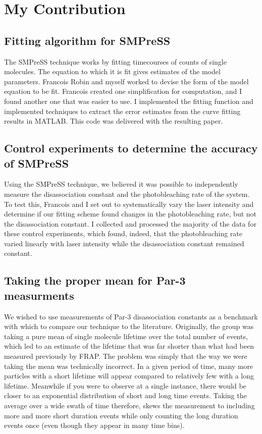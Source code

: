 \section{My Contribution}

\subsection{Fitting algorithm for SMPreSS}

The SMPreSS technique works by fitting timecourses of counts of single molecules.  The equation to which it is fit gives estimates of the model parameters.  Francois Robin and myself worked to devise the form of the model equation to be fit. Francois created one simplification for computation, and I found another one that was easier to use.  I implemented the fitting function and implemented techniques to extract the error estimates from the curve fitting results in MATLAB.  This code was delivered with the resulting paper.

\subsection{Control experiments to determine the accuracy of SMPreSS}

Using the SMPreSS technique, we believed it was possible to independently measure the disassociation constant and the photobleaching rate of the system.  To test this, Francois and I set out to systematically vary the laser intensity and determine if our fitting scheme found changes in the photobleaching rate, but not the disassociation constant.  I collected and processed the majority of the data for these control experiments, which found, indeed, that the photobleaching rate varied linearly with laser intensity while the disassociation constant remained constant.

\subsection{Taking the proper mean for Par-3 measurments}

We wished to use measurements of Par-3 disassociation constants as a benchmark with which to compare our technique to the literature.  Originally, the group was taking a pure mean of single molecule lifetime over the total number of events, which led to an estimate of the lifetime that was far shorter than what had been measured previously by FRAP.  The problem was simply that the way we were taking the mean was technically incorrect.  In a given period of time, many more particles with a short lifetime will appear compared to relatively few with a long lifetime.  Meanwhile if you were to observe at a single instance, there would be closer to an exponential distribution of short and long time events. Taking the average over a wide swath of time therefore, skews the measurement to including more and more short duration events while only counting the long duration events once (even though they appear in many time bins).

